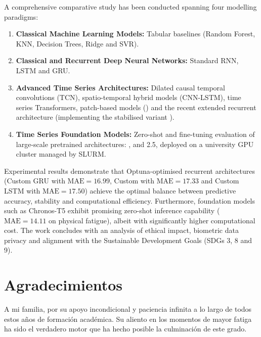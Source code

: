 A comprehensive comparative study has been conducted spanning four modelling paradigms:
\begin{enumerate}
    \item \textbf{Classical Machine Learning Models:} Tabular baselines (Random Forest, KNN, Decision Trees, Ridge and SVR).
    \item \textbf{Classical and Recurrent Deep Neural Networks:} Standard RNN, LSTM and GRU.
    \item \textbf{Advanced Time Series Architectures:} Dilated causal temporal convolutions (TCN), spatio-temporal hybrid models (CNN-LSTM), time series Transformers, patch-based models (\patchtst{}) and the recent extended recurrent architecture \xlstm{} (implementing the stabilised variant \slstm{}).
    \item \textbf{Time Series Foundation Models:} Zero-shot and fine-tuning evaluation of large-scale pretrained architectures: \moment{}, \chronos{} and \timesfm{} 2.5, deployed on a university GPU cluster managed by SLURM.
\end{enumerate}

Experimental results demonstrate that Optuna-optimised recurrent architectures (Custom GRU with $\text{MAE}=16.99$, Custom \xlstm{} with $\text{MAE}=17.33$ and Custom LSTM with $\text{MAE}=17.50$) achieve the optimal balance between predictive accuracy, stability and computational efficiency. Furthermore, foundation models such as Chronos-T5 exhibit promising zero-shot inference capability ($\text{MAE}=14.11$ on physical fatigue), albeit with significantly higher computational cost. The work concludes with an analysis of ethical impact, biometric data privacy and alignment with the Sustainable Development Goals (SDGs 3, 8 and 9).

\cleardoublepage

\chapter*{Agradecimientos}

A mi familia, por su apoyo incondicional y paciencia infinita a lo largo de todos estos años de formación académica. Su aliento en los momentos de mayor fatiga ha sido el verdadero motor que ha hecho posible la culminación de este grado.

